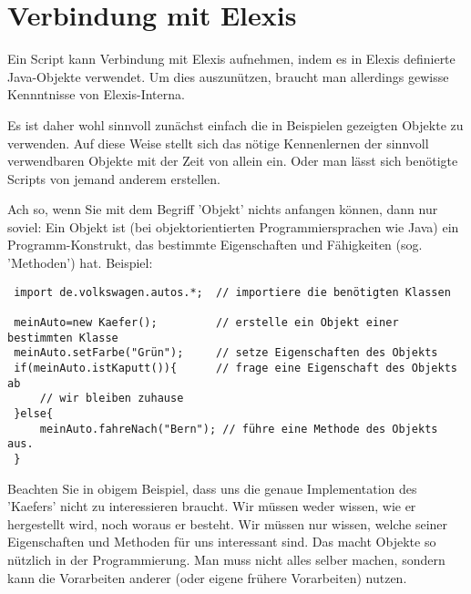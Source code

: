 \documentclass[a4paper]{scrartcl}
\begin{document}
\section{Verbindung mit Elexis}
Ein Script kann Verbindung mit Elexis aufnehmen, indem es in Elexis definierte Java-Objekte
verwendet. Um dies auszunützen, braucht man allerdings gewisse Kennntnisse von Elexis-Interna.

Es ist daher wohl sinnvoll zunächst einfach die in Beispielen gezeigten Objekte zu verwenden.
Auf diese Weise stellt sich das nötige Kennenlernen der sinnvoll verwendbaren Objekte mit der
Zeit von allein ein. Oder man lässt sich benötigte Scripts von jemand anderem erstellen.

\medskip

Ach so, wenn Sie mit dem Begriff 'Objekt' nichts anfangen können, dann nur soviel: Ein Objekt ist (bei objektorientierten Programmiersprachen wie Java) ein Programm-Konstrukt, das bestimmte Eigenschaften und Fähigkeiten (sog. 'Methoden') hat. Beispiel:
\begin{small}
\begin{verbatim}
 import de.volkswagen.autos.*;  // importiere die benötigten Klassen

 meinAuto=new Kaefer();         // erstelle ein Objekt einer bestimmten Klasse
 meinAuto.setFarbe("Grün");     // setze Eigenschaften des Objekts
 if(meinAuto.istKaputt()){      // frage eine Eigenschaft des Objekts ab
     // wir bleiben zuhause
 }else{
     meinAuto.fahreNach("Bern"); // führe eine Methode des Objekts aus.
 }

\end{verbatim}
\end{small}

Beachten Sie in obigem Beispiel, dass uns die genaue Implementation des 'Kaefers' nicht zu interessieren braucht. Wir müssen weder wissen, wie er hergestellt wird, noch woraus er besteht. Wir müssen nur wissen, welche seiner Eigenschaften und Methoden für uns interessant sind.
Das macht Objekte so nützlich in der Programmierung. Man muss nicht alles selber machen, sondern
kann die Vorarbeiten anderer (oder eigene frühere Vorarbeiten) nutzen.
\end{document}
